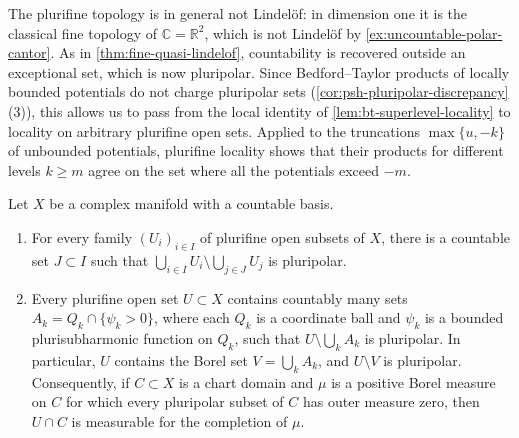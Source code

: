 The plurifine topology is in general not Lindel\"of: in dimension one it is the classical fine topology of $\mathbb C=\mathbb R^2$, which is not Lindel\"of by \cref{ex:uncountable-polar-cantor}. As in \cref{thm:fine-quasi-lindelof}, countability is recovered outside an exceptional set, which is now pluripolar. Since Bedford--Taylor products of locally bounded potentials do not charge pluripolar sets (\cref{cor:psh-pluripolar-discrepancy}(3)), this allows us to pass from the local identity of \cref{lem:bt-superlevel-locality} to locality on arbitrary plurifine open sets. Applied to the truncations $\max\{u,-k\}$ of unbounded potentials, plurifine locality shows that their products for different levels $k\ge m$ agree on the set where all the potentials exceed $-m$.

\begin{theorem}\label{thm:plurifine-quasi-lindelof}
Let $X$ be a complex manifold with a countable basis.
\begin{enumerate}
\item For every family $(U_i)_{i\in I}$ of plurifine open subsets of $X$, there is a countable set $J\subset I$ such that $\bigcup_{i\in I}U_i\setminus\bigcup_{j\in J}U_j$ is pluripolar.
\item Every plurifine open set $U\subset X$ contains countably many sets $A_k=Q_k\cap\{\psi_k>0\}$, where each $Q_k$ is a coordinate ball and $\psi_k$ is a bounded plurisubharmonic function on $Q_k$, such that $U\setminus\bigcup_kA_k$ is pluripolar. In particular, $U$ contains the Borel set $V=\bigcup_kA_k$, and $U\setminus V$ is pluripolar. Consequently, if $C\subset X$ is a chart domain and $\mu$ is a positive Borel measure on $C$ for which every pluripolar subset of $C$ has outer measure zero, then $U\cap C$ is measurable for the completion of $\mu$.
\end{enumerate}
\end{theorem}
